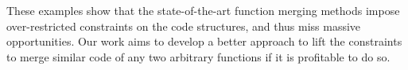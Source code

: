 

These examples show that the state-of-the-art function merging methods impose over-restricted constraints on the code structures, and thus
miss massive opportunities. Our work aims to develop a better approach to lift the constraints to merge similar code of any two arbitrary
functions if it is profitable to do so.
